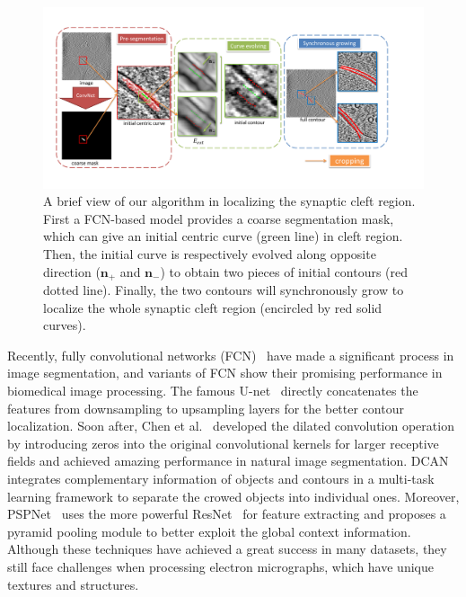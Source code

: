 \begin{figure}[t]
    \begin{center}
        \includegraphics[width=7in]{figs/FigCG.pdf}
   \end{center}
\caption{A brief view of our algorithm in localizing the synaptic cleft region. First a FCN-based model provides a coarse segmentation mask, which can give an initial centric curve (green line) in cleft region.
        Then, the initial curve is respectively evolved along opposite direction ($\mathbf{n}_+$ and $\mathbf{n}_-$) to obtain two pieces of initial contours (red dotted line).
        Finally, the two contours will synchronously grow to localize the whole synaptic cleft region (encircled by red solid curves).}
\label{fig:cg}
\end{figure}


Recently, fully convolutional networks (FCN)~\cite{Long2015,Ronneberger2015,Chen2016a,Chen2017,Zhao2016} have made a significant process in image segmentation, and variants of FCN \cite{Ronneberger2015,Chen2017,Dhungel2015,Lieman-Sifry2017,Chen2016b,Ourselin} show their promising performance in biomedical image processing.
%
The famous U-net~\cite{Ronneberger2015} directly concatenates the features from downsampling to upsampling layers for the better contour localization.
Soon after, Chen et al.~\cite{Chen2016a} developed the dilated convolution operation by introducing zeros into the original convolutional kernels for larger receptive fields and achieved amazing performance in natural image segmentation.
DCAN~\cite{Chen2017} integrates complementary information of objects and contours in a multi-task learning framework to separate the crowed objects into individual ones.
Moreover, PSPNet~\cite{Zhao2016} uses the more powerful ResNet~\cite{He2016} for feature extracting and proposes a pyramid pooling module to better exploit the global context information.
%
Although these techniques have achieved a great success in many datasets, they still face challenges when processing electron micrographs, which have unique textures and structures.

